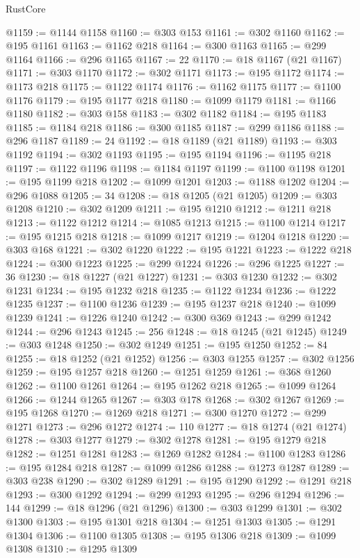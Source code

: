 \begin{lexlean}{RustCore}
\begin{coremodule}
@1159 := @1144 @1158
@1160 := @303 @153
@1161 := @302 @1160
@1162 := @195 @1161
@1163 := @1162 @218
@1164 := @300 @1163
@1165 := @299 @1164
@1166 := @296 @1165
@1167 := 22
@1170 := @18 @1167 (@21 @1167)
@1171 := @303 @1170
@1172 := @302 @1171
@1173 := @195 @1172
@1174 := @1173 @218
@1175 := @1122 @1174
@1176 := @1162 @1175
@1177 := @1100 @1176
@1179 := @195 @1177 @218
@1180 := @1099 @1179
@1181 := @1166 @1180
@1182 := @303 @158
@1183 := @302 @1182
@1184 := @195 @1183
@1185 := @1184 @218
@1186 := @300 @1185
@1187 := @299 @1186
@1188 := @296 @1187
@1189 := 24
@1192 := @18 @1189 (@21 @1189)
@1193 := @303 @1192
@1194 := @302 @1193
@1195 := @195 @1194
@1196 := @1195 @218
@1197 := @1122 @1196
@1198 := @1184 @1197
@1199 := @1100 @1198
@1201 := @195 @1199 @218
@1202 := @1099 @1201
@1203 := @1188 @1202
@1204 := @296 @1088
@1205 := 34
@1208 := @18 @1205 (@21 @1205)
@1209 := @303 @1208
@1210 := @302 @1209
@1211 := @195 @1210
@1212 := @1211 @218
@1213 := @1122 @1212
@1214 := @1085 @1213
@1215 := @1100 @1214
@1217 := @195 @1215 @218
@1218 := @1099 @1217
@1219 := @1204 @1218
@1220 := @303 @168
@1221 := @302 @1220
@1222 := @195 @1221
@1223 := @1222 @218
@1224 := @300 @1223
@1225 := @299 @1224
@1226 := @296 @1225
@1227 := 36
@1230 := @18 @1227 (@21 @1227)
@1231 := @303 @1230
@1232 := @302 @1231
@1234 := @195 @1232 @218
@1235 := @1122 @1234
@1236 := @1222 @1235
@1237 := @1100 @1236
@1239 := @195 @1237 @218
@1240 := @1099 @1239
@1241 := @1226 @1240
@1242 := @300 @369
@1243 := @299 @1242
@1244 := @296 @1243
@1245 := 256
@1248 := @18 @1245 (@21 @1245)
@1249 := @303 @1248
@1250 := @302 @1249
@1251 := @195 @1250
@1252 := 84
@1255 := @18 @1252 (@21 @1252)
@1256 := @303 @1255
@1257 := @302 @1256
@1259 := @195 @1257 @218
@1260 := @1251 @1259
@1261 := @368 @1260
@1262 := @1100 @1261
@1264 := @195 @1262 @218
@1265 := @1099 @1264
@1266 := @1244 @1265
@1267 := @303 @178
@1268 := @302 @1267
@1269 := @195 @1268
@1270 := @1269 @218
@1271 := @300 @1270
@1272 := @299 @1271
@1273 := @296 @1272
@1274 := 110
@1277 := @18 @1274 (@21 @1274)
@1278 := @303 @1277
@1279 := @302 @1278
@1281 := @195 @1279 @218
@1282 := @1251 @1281
@1283 := @1269 @1282
@1284 := @1100 @1283
@1286 := @195 @1284 @218
@1287 := @1099 @1286
@1288 := @1273 @1287
@1289 := @303 @238
@1290 := @302 @1289
@1291 := @195 @1290
@1292 := @1291 @218
@1293 := @300 @1292
@1294 := @299 @1293
@1295 := @296 @1294
@1296 := 144
@1299 := @18 @1296 (@21 @1296)
@1300 := @303 @1299
@1301 := @302 @1300
@1303 := @195 @1301 @218
@1304 := @1251 @1303
@1305 := @1291 @1304
@1306 := @1100 @1305
@1308 := @195 @1306 @218
@1309 := @1099 @1308
@1310 := @1295 @1309

\end{coremodule}
\end{lexlean}
